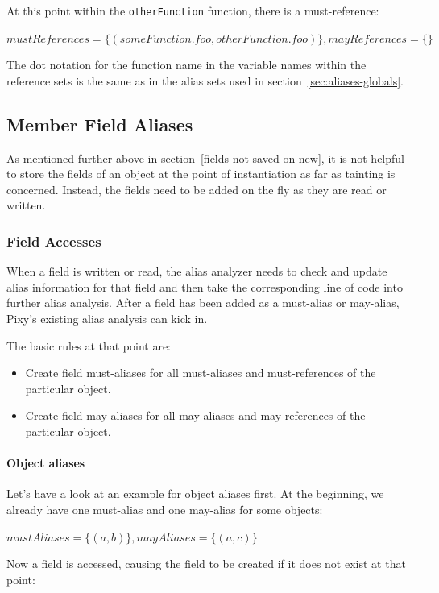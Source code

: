 At this point within the \texttt{otherFunction} function, there is a must-reference:

$mustReferences = \{(someFunction.foo, otherFunction.foo)\}, mayReferences = \{\}$

The dot notation for the function name in the variable names within the reference sets is the same as in the alias sets used in section~\ref{sec:aliases-globals}.


\subsection{Member Field Aliases}

As mentioned further above in section~\ref{fields-not-saved-on-new}, it is not helpful to store the fields of an object at the point of instantiation as far as tainting is concerned. Instead, the fields need to be added on the fly as they are read or written.


\subsubsection{Field Accesses}

When a field is written or read, the alias analyzer needs to check and update alias information for that field and then take the corresponding line of code into further alias analysis. After a field has been added as a must-alias or may-alias, Pixy's existing alias analysis can kick in.

The basic rules at that point are:

\begin{itemize}
  \item Create field must-aliases for all must-aliases and must-references of the particular object.
  \item Create field may-aliases for all may-aliases and may-references of the particular object.
\end{itemize}


\paragraph{Object aliases}

Let's have a look at an example for object aliases first. At the beginning, we already have one must-alias and one may-alias for some objects:

$mustAliases = \{(a, b)\}, mayAliases = \{(a, c)\}$

Now a field is accessed, causing the field to be created if it does not exist at that point:

